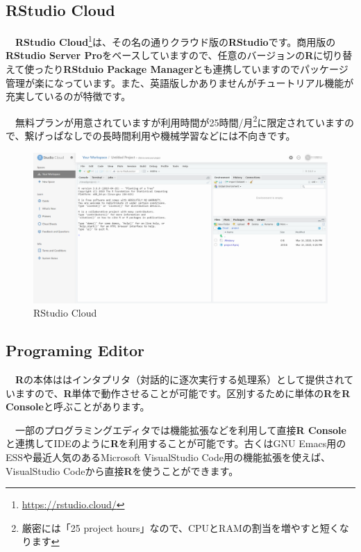 \documentclass[
  12pt,
]{book}
\DeclareRobustCommand{\href}[2]{#2\footnote{\url{#1}}}
\begin{document}
\hypertarget{rstudio-cloud}{%
\subsection{RStudio Cloud}\label{rstudio-cloud}}

　\href{https://rstudio.cloud/}{\textbf{RStudio Cloud}}は、その名の通りクラウド版の\textbf{RStudio}です。商用版の\textbf{RStudio Server Pro}をベースしていますので、任意のバージョンの\textbf{R}に切り替えて使ったり\textbf{RStduio Package Manager}とも連携していますのでパッケージ管理が楽になっています。また、英語版しかありませんがチュートリアル機能が充実しているのが特徴です。

　無料プランが用意されていますが利用時間が25時間/月\footnote{厳密には「25 project hours」なので、CPUとRAMの割当を増やすと短くなります}に限定されていますので、繋げっぱなしでの長時間利用や機械学習などには不向きです。

\begin{figure}[H]

{\centering \includegraphics[width=0.9\linewidth,]{./fig/RStudio/RSCloud_01} 

}

\caption{RStudio Cloud}\label{fig:unnamed-chunk-18}
\end{figure}

\hypertarget{programing-editor}{%
\subsection{Programing Editor}\label{programing-editor}}

　\textbf{R}の本体ははインタプリタ（対話的に逐次実行する処理系）として提供されていますので、\textbf{R}単体で動作させることが可能です。区別するために単体の\textbf{R}を\textbf{R Console}と呼ぶことがあります。

　一部のプログラミングエディタでは機能拡張などを利用して直接\textbf{R Console}と連携してIDEのように\textbf{R}を利用することが可能です。古くはGNU Emacs用のESSや最近人気のあるMicrosoft VisualStudio Code用の機能拡張を使えば、VisualStudio Codeから直接\textbf{R}を使うことができます。
\end{document}
